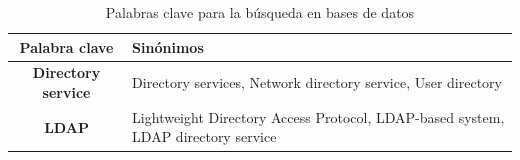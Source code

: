 \begin{table}[H]
	\centering
	\caption{Palabras clave para la búsqueda en bases de datos}
	\label{tab:palabras-clave}

	\renewcommand{\arraystretch}{1.2}
	\fontsize{9pt}{10pt}\selectfont

	\begin{tabularx}{\textwidth}{|c|X|}
		\hline
		\tableheader
		\textbf{Palabra clave}     &
		\textbf{Sinónimos}
		\\
		\hline
		\textbf{Directory service} &
		Directory services, Network directory service, User directory
		\\
		\hline
		\textbf{LDAP}              &
		Lightweight Directory Access Protocol, LDAP-based system, LDAP directory service
		\\
		\hline
	\end{tabularx}
\end{table}
